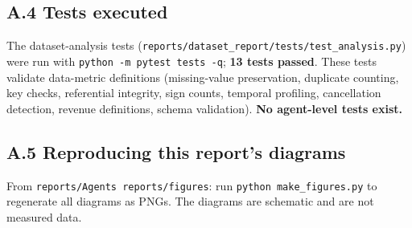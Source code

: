 \documentclass[11pt,a4paper]{article}
\newcommand{\code}[1]{\texttt{#1}}
\begin{document}
\subsection*{A.4 Tests executed}
The dataset-analysis tests (\code{reports/dataset\_report/tests/test\_analysis.py}) were run with \code{python -m pytest tests -q}; \textbf{13 tests passed}. These tests validate data-metric definitions (missing-value preservation, duplicate counting, key checks, referential integrity, sign counts, temporal profiling, cancellation detection, revenue definitions, schema validation). \textbf{No agent-level tests exist.}

\subsection*{A.5 Reproducing this report's diagrams}
From \code{reports/Agents reports/figures}: run \code{python make\_figures.py} to regenerate all diagrams as PNGs. The diagrams are schematic and are not measured data.
\end{document}

